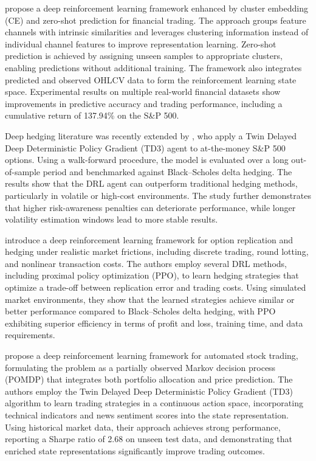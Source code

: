 \documentclass[]{elsarticle}
\begin{document}
\citet{Meng2026} propose a deep reinforcement learning framework enhanced by cluster embedding (CE) and zero-shot prediction for financial trading. The approach groups feature channels with intrinsic similarities and leverages clustering information instead of individual channel features to improve representation learning. Zero-shot prediction is achieved by assigning unseen samples to appropriate clusters, enabling predictions without additional training. The framework also integrates predicted and observed OHLCV data to form the reinforcement learning state space. Experimental results on multiple real-world financial datasets show improvements in predictive accuracy and trading performance, including a cumulative return of 137.94\% on the S\&P 500.

Deep hedging literature was recently extended by \citet{bracha2025application}, who apply a Twin Delayed Deep Deterministic Policy Gradient (TD3) agent to at-the-money S\&P 500 options. Using a walk-forward procedure, the model is evaluated over a long out-of-sample period and benchmarked against Black–Scholes delta hedging. The results show that the DRL agent can outperform traditional hedging methods, particularly in volatile or high-cost environments. The study further demonstrates that higher risk-awareness penalties can deteriorate performance, while longer volatility estimation windows lead to more stable results.

\citet{Zhang_2020} introduce a deep reinforcement learning framework for option replication and hedging under realistic market frictions, including discrete trading, round lotting, and nonlinear transaction costs. The authors employ several DRL methods, including proximal policy optimization (PPO), to learn hedging strategies that optimize a trade-off between replication error and trading costs. Using simulated market environments, they show that the learned strategies achieve similar or better performance compared to Black–Scholes delta hedging, with PPO exhibiting superior efficiency in terms of profit and loss, training time, and data requirements.

\citet{kabbani2022deep} propose a deep reinforcement learning framework for automated stock trading, formulating the problem as a partially observed Markov decision process (POMDP) that integrates both portfolio allocation and price prediction. The authors employ the Twin Delayed Deep Deterministic Policy Gradient (TD3) algorithm to learn trading strategies in a continuous action space, incorporating technical indicators and news sentiment scores into the state representation. Using historical market data, their approach achieves strong performance, reporting a Sharpe ratio of 2.68 on unseen test data, and demonstrating that enriched state representations significantly improve trading outcomes.
\end{document}
